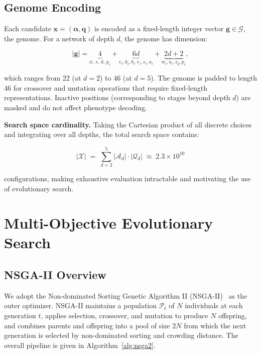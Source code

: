 \documentclass[journal]{IEEEtran}
\newcommand{\calA}{\mathcal{A}}
\newcommand{\calQ}{\mathcal{Q}}
\newcommand{\calX}{\mathcal{X}}
\begin{document}
\subsection{Genome Encoding}
\label{sec:genome}

Each candidate $\bm{x} = (\bm{\alpha}, \bm{q})$ is encoded as a fixed-length
integer vector $\bm{g} \in \mathcal{G}$, the genome.
For a network of depth $d$, the genome has dimension:

\begin{equation}
|\bm{g}| = \underbrace{4}_{\phi,\, s,\, d,\, p_c} +
\underbrace{6d}_{c_i, k_i, b_i, r_i, s_i, a_i} +
\underbrace{2d + 2}_{w_i, a_i, s_q, p_c},
\label{eq:genome_dim}
\end{equation}

which ranges from 22 (at $d=2$) to 46 (at $d=5$).
The genome is padded to length 46 for crossover and mutation operations that
require fixed-length representations.
Inactive positions (corresponding to stages beyond depth $d$) are masked
and do not affect phenotype decoding.

\noindent\textbf{Search space cardinality.}
Taking the Cartesian product of all discrete choices and integrating over all
depths, the total search space contains:

\begin{equation}
|\calX| \;=\; \sum_{d=2}^{5}
  |\calA_d| \cdot |\calQ_d|
  \;\approx\; 2.3 \times 10^{10}
\label{eq:space_size}
\end{equation}

configurations, making exhaustive evaluation intractable and motivating the
use of evolutionary search.

\section{Multi-Objective Evolutionary Search}
\label{sec:nsga2}

\subsection{NSGA-II Overview}

We adopt the Non-dominated Sorting Genetic Algorithm II
(NSGA-II)~\cite{deb2002fast} as the outer optimizer.
NSGA-II maintains a population $\mathcal{P}_t$ of $N$ individuals at each
generation $t$, applies selection, crossover, and mutation to produce $N$
offspring, and combines parents and offspring into a pool of size $2N$ from
which the next generation is selected by non-dominated sorting and crowding
distance.
The overall pipeline is given in Algorithm~\ref{alg:nsga2}.
\end{document}
